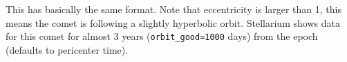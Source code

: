 This has basically the same format. Note that eccentricity is larger than 1,
this means the comet is following a slightly hyperbolic
orbit. Stellarium shows data for this comet for almost 3 years
(\texttt{orbit\_good=1000} days) from the epoch (defaults to pericenter time).





